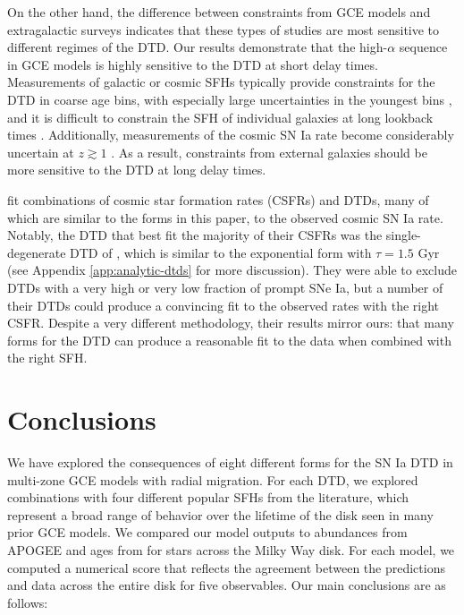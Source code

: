 \documentclass[twocolumn,twocolappendix,linenumbers]{aastex631}
\begin{document}
On the other hand, the difference between constraints from GCE models and extragalactic surveys indicates that these types of studies are most sensitive to different regimes of the DTD. Our results demonstrate that the high-$\alpha$ sequence in GCE models is highly sensitive to the DTD at short delay times. Measurements of galactic or cosmic SFHs typically provide constraints for the DTD in coarse age bins, with especially large uncertainties in the youngest bins \citep[e.g.,][]{MaozMannucci2012-SNeIaReview}, and it is difficult to constrain the SFH of individual galaxies at long lookback times \citep{Conroy2013-PanchromaticSED}. Additionally, measurements of the cosmic SN Ia rate become considerably uncertain at $z\gtrsim1$ \citep[see, e.g.,][]{Palicio2024-CosmicSNIaRate}. As a result, constraints from external galaxies should be more sensitive to the DTD at long delay times.

\citet{Palicio2024-CosmicSNIaRate} fit combinations of cosmic star formation rates (CSFRs) and DTDs, many of which are similar to the forms in this paper, to the observed cosmic SN Ia rate. Notably, the DTD that best fit the majority of their CSFRs was the single-degenerate DTD of \citet{MatteucciRecchi2001-SNIaTimescale}, which is similar to the exponential form with $\tau=1.5$ Gyr (see Appendix \ref{app:analytic-dtds} for more discussion). They were able to exclude DTDs with a very high or very low fraction of prompt SNe Ia, but a number of their DTDs could produce a convincing fit to the observed rates with the right CSFR. Despite a very different methodology, their results mirror ours: that many forms for the DTD can produce a reasonable fit to the data when combined with the right SFH. 

\section{Conclusions}
\label{sec:conclusions}

We have explored the consequences of eight different forms for the SN Ia DTD in multi-zone GCE models with radial migration. For each DTD, we explored combinations with four different popular SFHs from the literature, which represent a broad range of behavior over the lifetime of the disk seen in many prior GCE models. We compared our model outputs to abundances from APOGEE and ages from  for stars across the Milky Way disk. For each model, we computed a numerical score that reflects the agreement between the predictions and data across the entire disk for five observables. Our main conclusions are as follows:
\end{document}

